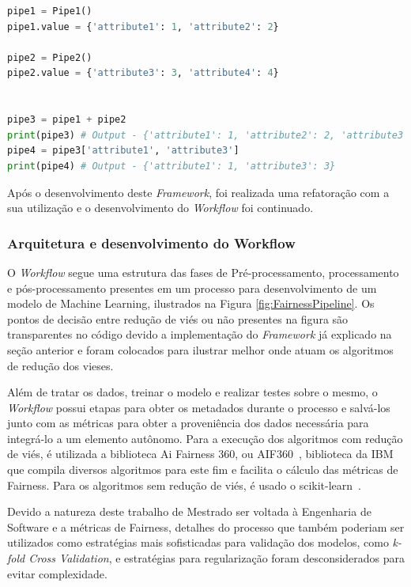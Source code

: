 \documentclass[portugues]{ic-tese}
\begin{document}
\begin{lstlisting}[language=Python, caption=Manipulações para Pipes com métodos especiais,label=cod:PipeAndFilterManipulationSpecial]
pipe1 = Pipe1()
pipe1.value = {'attribute1': 1, 'attribute2': 2}

pipe2 = Pipe2()
pipe2.value = {'attribute3': 3, 'attribute4': 4}


pipe3 = pipe1 + pipe2
print(pipe3) # Output - {'attribute1': 1, 'attribute2': 2, 'attribute3': 3, 'attribute4': 4}
pipe4 = pipe3['attribute1', 'attribute3']
print(pipe4) # Output - {'attribute1': 1, 'attribute3': 3}
\end{lstlisting}

Após o desenvolvimento deste \textit{Framework}, foi realizada uma refatoração com a sua utilização e o desenvolvimento do \textit{Workflow} foi continuado.

\subsubsection{Arquitetura e desenvolvimento do Workflow}

O \textit{Workflow} segue uma estrutura das fases de Pré-processamento, processamento e pós-processamento presentes em um processo para desenvolvimento de um modelo de Machine Learning, ilustrados na Figura \ref{fig:FairnessPipeline}. Os pontos de decisão entre redução de viés ou não presentes na figura são transparentes no código devido a implementação do \textit{Framework} já explicado na seção anterior e foram colocados para ilustrar melhor onde atuam os algoritmos de redução dos vieses.

Além de tratar os dados, treinar o modelo e realizar testes sobre o mesmo, o \textit{Workflow} possui etapas para obter os metadados durante o processo e salvá-los junto com as métricas para obter a proveniência dos dados necessária para integrá-lo a um elemento autônomo. Para a execução dos algoritmos com redução de viés, é utilizada a biblioteca Ai Fairness 360, ou AIF360~\citep{AIF360_2022}, biblioteca da IBM que compila diversos algoritmos para este fim e facilita o cálculo das métricas de Fairness. Para os algoritmos sem redução de viés, é usado o scikit-learn~\citep{scikit_2022}.

Devido a natureza deste trabalho de Mestrado ser voltada à Engenharia de Software e a métricas de Fairness, detalhes do processo que também poderiam ser utilizados como estratégias mais sofisticadas para validação dos modelos, como \textit{k-fold Cross Validation}, e estratégias para regularização foram desconsiderados para evitar complexidade.
\end{document}
